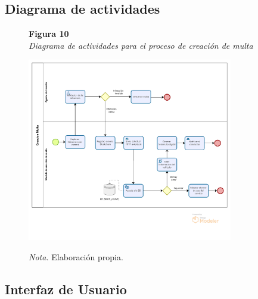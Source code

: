 \subsection{ Diagrama de actividades }
 \begin{figure}[htbp]
    \begin{flushleft}
        \textbf{Figura 10}\\[2em]
        \textit{Diagrama de actividades para el proceso de creación de multa}
    \end{flushleft}
    \vspace{1em}
    \centering
    \includegraphics[width=0.8\textwidth]{Images/ActMulta.png}
    \vspace{2em}
    \begin{flushleft}
        \textit{Nota.} Elaboración propia.
    \end{flushleft}
    \label{fig:diagrama_creacion_multa}
\end{figure}

\subsection{Interfaz de Usuario}
